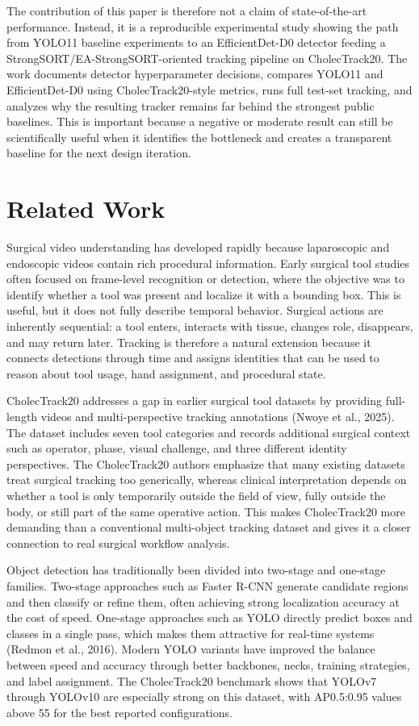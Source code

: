 \documentclass[12pt,a4paper]{article}
\begin{document}
The contribution of this paper is therefore not a claim of state-of-the-art performance. Instead, it is a reproducible experimental study showing the path from YOLO11 baseline experiments to an EfficientDet-D0 detector feeding a StrongSORT/EA-StrongSORT-oriented tracking pipeline on CholecTrack20. The work documents detector hyperparameter decisions, compares YOLO11 and EfficientDet-D0 using CholecTrack20-style metrics, runs full test-set tracking, and analyzes why the resulting tracker remains far behind the strongest public baselines. This is important because a negative or moderate result can still be scientifically useful when it identifies the bottleneck and creates a transparent baseline for the next design iteration.

\section{Related Work}

Surgical video understanding has developed rapidly because laparoscopic and endoscopic videos contain rich procedural information. Early surgical tool studies often focused on frame-level recognition or detection, where the objective was to identify whether a tool was present and localize it with a bounding box. This is useful, but it does not fully describe temporal behavior. Surgical actions are inherently sequential: a tool enters, interacts with tissue, changes role, disappears, and may return later. Tracking is therefore a natural extension because it connects detections through time and assigns identities that can be used to reason about tool usage, hand assignment, and procedural state.

CholecTrack20 addresses a gap in earlier surgical tool datasets by providing full-length videos and multi-perspective tracking annotations (Nwoye et al., 2025). The dataset includes seven tool categories and records additional surgical context such as operator, phase, visual challenge, and three different identity perspectives. The CholecTrack20 authors emphasize that many existing datasets treat surgical tracking too generically, whereas clinical interpretation depends on whether a tool is only temporarily outside the field of view, fully outside the body, or still part of the same operative action. This makes CholecTrack20 more demanding than a conventional multi-object tracking dataset and gives it a closer connection to real surgical workflow analysis.

Object detection has traditionally been divided into two-stage and one-stage families. Two-stage approaches such as Faster R-CNN generate candidate regions and then classify or refine them, often achieving strong localization accuracy at the cost of speed. One-stage approaches such as YOLO directly predict boxes and classes in a single pass, which makes them attractive for real-time systems (Redmon et al., 2016). Modern YOLO variants have improved the balance between speed and accuracy through better backbones, necks, training strategies, and label assignment. The CholecTrack20 benchmark shows that YOLOv7 through YOLOv10 are especially strong on this dataset, with AP0.5:0.95 values above 55 for the best reported configurations.
\end{document}
